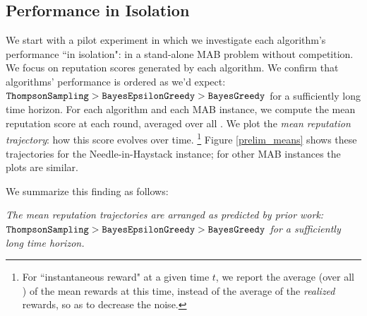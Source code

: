 \documentclass[../competing_bandits.tex]{subfiles}
\begin{document}
\subsection{Performance in Isolation}\label{sec:isolation}

We start with a pilot experiment in which we investigate each algorithm's performance ``in isolation": in a stand-alone MAB problem without competition. We focus on reputation scores generated by each algorithm. We confirm that algorithms' performance is ordered as we'd expect:
    $\mathtt{ThompsonSampling} > \mathtt{BayesEpsilonGreedy} > \mathtt{BayesGreedy}$
for a sufficiently long time horizon. For each algorithm and each MAB instance, we compute the mean reputation score at each round, averaged over all \MRVs. We plot the \emph{mean reputation trajectory}: how this score evolves over time. %
\footnote{For ``instantaneous reward" at a given time $t$, we report the average (over all \MRVs) of the mean rewards at this time, instead of the average of the \emph{realized} rewards, so as to decrease the noise.}
Figure \ref{prelim_means} shows these trajectories for the Needle-in-Haystack instance; for other MAB instances the plots are similar. 

We summarize this finding as follows:

\begin{finding}
\textit{The mean reputation trajectories  are arranged as predicted by prior work:
    $\mathtt{ThompsonSampling} > \mathtt{BayesEpsilonGreedy} > \mathtt{BayesGreedy}$ for a sufficiently long time horizon.}
\end{finding}
\end{document}
